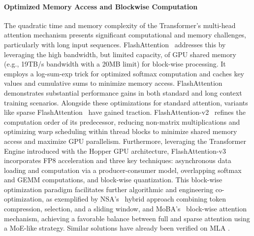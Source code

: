 \documentclass[11pt, a4paper, logo, copyright, nonumbering]{map}
\begin{document}
\paragraph{Optimized Memory Access and Blockwise Computation}
The quadratic time and memory complexity of the Transformer's multi-head attention mechanism presents significant computational and memory challenges, particularly with long input sequences. 
FlashAttention~\cite{dao2022flashattention} addresses this by leveraging the high bandwidth, but limited capacity, of GPU shared memory (e.g., 19TB/s bandwidth with a 20MB limit) for block-wise processing.
It employs a log-sum-exp trick for optimized softmax computation and caches key values and cumulative sums to minimize memory access.  FlashAttention demonstrates substantial performance gains in both standard and long context training scenarios.
Alongside these optimizations for standard attention, variants like sparse FlashAttention~\cite{pagliardini2023fast} have gained traction.
FlashAttention-v2~\cite{dao2024flashattention} refines the computation order of its predecessor, reducing non-matrix multiplications and optimizing warp scheduling within thread blocks to minimize shared memory access and maximize GPU parallelism.
Furthermore, leveraging the Transformer Engine introduced with the Hopper GPU architecture, FlashAttention-v3~\cite{shah2025flashattention} incorporates FP8 acceleration and three key techniques: asynchronous data loading and computation via a producer-consumer model, overlapping softmax and GEMM computations, and block-wise quantization.
This block-wise optimization paradigm facilitates further algorithmic and engineering co-optimization, as exemplified by NSA's~\cite{yuan2025native} hybrid approach combining token compression, selection, and a sliding window, 
and MoBA's~\cite{lu2025moba} block-wise attention mechanism, achieving a favorable balance between full and sparse attention using a MoE-like strategy.
Similar solutions have already been verified on MLA \cite{flashmla2025}.
\end{document}
